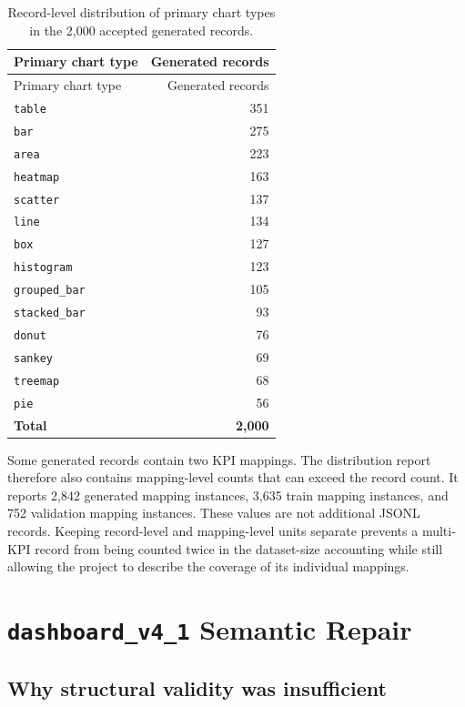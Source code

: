 \begingroup\footnotesize\setlength{\tabcolsep}{3pt}\sloppy
\begin{longtable}[]{@{}lr@{}}
\caption{Record-level distribution of primary chart types in the 2,000 accepted generated records.}\tabularnewline
\toprule\noalign{}
Primary chart type & Generated records \\
\midrule\noalign{}
\endfirsthead
\toprule\noalign{}
Primary chart type & Generated records \\
\midrule\noalign{}
\endhead
\bottomrule\noalign{}
\endlastfoot
\texttt{table} & 351 \\
\texttt{bar} & 275 \\
\texttt{area} & 223 \\
\texttt{heatmap} & 163 \\
\texttt{scatter} & 137 \\
\texttt{line} & 134 \\
\texttt{box} & 127 \\
\texttt{histogram} & 123 \\
\texttt{grouped\_bar} & 105 \\
\texttt{stacked\_bar} & 93 \\
\texttt{donut} & 76 \\
\texttt{sankey} & 69 \\
\texttt{treemap} & 68 \\
\texttt{pie} & 56 \\
\textbf{Total} & \textbf{2,000} \\
\end{longtable}
\endgroup

Some generated records contain two KPI mappings. The distribution report therefore also contains mapping-level counts that can exceed the record count. It reports 2,842 generated mapping instances, 3,635 train mapping instances, and 752 validation mapping instances. These values are not additional JSONL records. Keeping record-level and mapping-level units separate prevents a multi-KPI record from being counted twice in the dataset-size accounting while still allowing the project to describe the coverage of its individual mappings.

\section{\texorpdfstring{\texttt{dashboard\_v4\_1} Semantic Repair}{dashboard\_v4\_1 Semantic Repair}}

\subsection{Why structural validity was insufficient}

